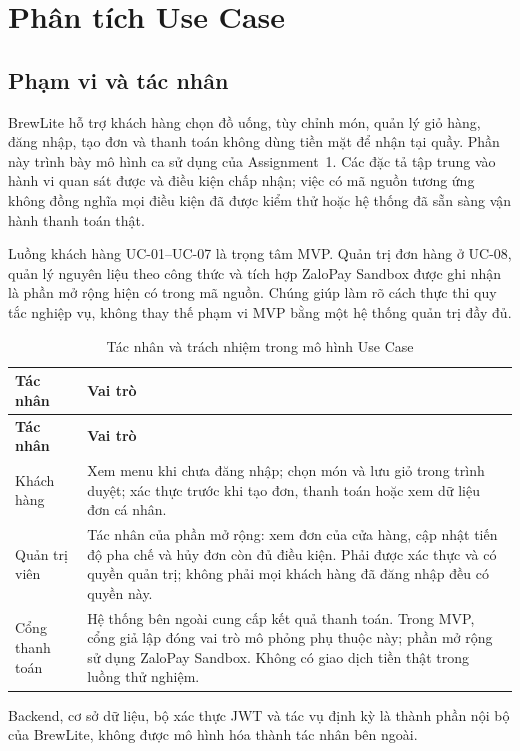 \section{Phân tích Use Case}
\label{sec:use-cases}

\subsection{Phạm vi và tác nhân}

BrewLite hỗ trợ khách hàng chọn đồ uống, tùy chỉnh món, quản lý giỏ hàng,
đăng nhập, tạo đơn và thanh toán không dùng tiền mặt để nhận tại quầy.
Phần này trình bày mô hình ca sử dụng của Assignment~1. Các đặc tả tập trung
vào hành vi quan sát được và điều kiện chấp nhận; việc có mã nguồn tương ứng
không đồng nghĩa mọi điều kiện đã được kiểm thử hoặc hệ thống đã sẵn sàng
vận hành thanh toán thật.

Luồng khách hàng UC-01--UC-07 là trọng tâm MVP. Quản trị đơn hàng ở UC-08,
quản lý nguyên liệu theo công thức và tích hợp ZaloPay Sandbox được ghi nhận
là phần mở rộng hiện có trong mã nguồn. Chúng giúp làm rõ cách thực thi
quy tắc nghiệp vụ, không thay thế phạm vi MVP bằng một hệ thống quản trị đầy đủ.

\begin{longtable}{|p{3.0cm}|p{11.6cm}|}
\caption{Tác nhân và trách nhiệm trong mô hình Use Case}
\label{tab:uc-actors}\\ \hline
\textbf{Tác nhân} & \textbf{Vai trò} \\ \hline
\endfirsthead
\hline \textbf{Tác nhân} & \textbf{Vai trò} \\ \hline
\endhead
Khách hàng & Xem menu khi chưa đăng nhập; chọn món và lưu giỏ trong trình
duyệt; xác thực trước khi tạo đơn, thanh toán hoặc xem dữ liệu đơn cá nhân. \\ \hline
Quản trị viên & Tác nhân của phần mở rộng: xem đơn của cửa hàng, cập nhật
tiến độ pha chế và hủy đơn còn đủ điều kiện. Phải được xác thực và có quyền
quản trị; không phải mọi khách hàng đã đăng nhập đều có quyền này. \\ \hline
Cổng thanh toán & Hệ thống bên ngoài cung cấp kết quả thanh toán. Trong
MVP, cổng giả lập đóng vai trò mô phỏng phụ thuộc này; phần mở rộng sử dụng
ZaloPay Sandbox. Không có giao dịch tiền thật trong luồng thử nghiệm. \\ \hline
\end{longtable}

Backend, cơ sở dữ liệu, bộ xác thực JWT và tác vụ định kỳ là thành phần
nội bộ của BrewLite, không được mô hình hóa thành tác nhân bên ngoài.

